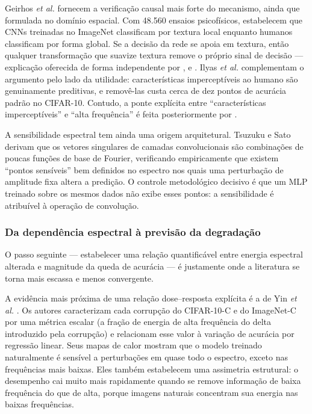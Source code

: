 \documentclass[conference]{IEEEtran}
\begin{document}
Geirhos \textit{et al.} \cite{b16} fornecem a verificação causal mais forte do
mecanismo, ainda que formulada no domínio espacial. Com 48.560 ensaios
psicofísicos, estabelecem que CNNs treinadas no ImageNet classificam por 
textura local enquanto humanos classificam por forma global. Se a decisão da 
rede se apoia em textura, então qualquer transformação que suavize textura 
remove o próprio sinal de decisão --- explicação oferecida de forma independente 
por \cite{b1}, \cite{b2} e \cite{b8}. Ilyas \textit{et al.} \cite{b17} complementam 
o argumento pelo lado da utilidade: características imperceptíveis ao humano são 
genuinamente preditivas, e removê-las custa cerca de dez pontos de acurácia padrão 
no CIFAR-10. Contudo, a ponte explícita entre ``características imperceptíveis'' e 
``alta frequência'' é feita posteriormente por \cite{b18}.

A sensibilidade espectral tem ainda uma origem arquitetural. Tsuzuku e Sato
\cite{b19} derivam que os vetores singulares de camadas convolucionais 
são combinações de poucas funções de base de Fourier, verificando empiricamente 
que existem ``pontos sensíveis'' bem definidos no espectro nos quais uma 
perturbação de amplitude fixa altera a predição. O controle metodológico decisivo 
é que um MLP treinado sobre os mesmos dados não exibe esses pontos: a sensibilidade 
é atribuível à operação de convolução. 

\subsubsection{Da dependência espectral à previsão da degradação}

O passo seguinte --- estabelecer uma relação quantificável entre energia
espectral alterada e magnitude da queda de acurácia --- é justamente onde a
literatura se torna mais escassa e menos convergente.

A evidência mais próxima de uma relação dose--resposta explícita é a de Yin
\textit{et al.} \cite{b18}. Os autores caracterizam cada corrupção do
CIFAR-10-C e do ImageNet-C por uma métrica escalar (a fração de energia de alta
frequência do delta introduzido pela corrupção) e relacionam esse valor à
variação de acurácia por regressão linear. Seus mapas de calor mostram que o 
modelo treinado naturalmente é sensível a perturbações em quase todo o espectro, 
exceto nas frequências mais baixas. Eles também estabelecem uma assimetria estrutural: 
o desempenho cai muito mais rapidamente quando se remove informação de baixa
frequência do que de alta, porque imagens naturais concentram sua energia nas
baixas frequências.
\end{document}
